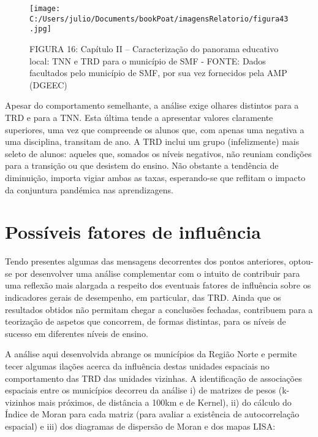 \documentclass[
]{book}
\begin{document}
\begin{figure}
\centering
\texttt{[image: C:/Users/julio/Documents/bookPoat/imagensRelatorio/figura43.jpg]}
\caption{FIGURA 16: Capítulo II -- Caracterização do panorama educativo local: TNN e TRD para o município de SMF - FONTE: Dados facultados pelo município de SMF, por sua vez fornecidos pela AMP (DGEEC)}
\end{figure}

Apesar do comportamento semelhante, a análise exige olhares distintos para a TRD e para a TNN. Esta última tende a apresentar valores claramente superiores, uma vez que compreende os alunos que, com apenas uma negativa a uma disciplina, transitam de ano. A TRD inclui um grupo (infelizmente) mais seleto de alunos: aqueles que, somados os níveis negativos, não reuniam condições para a transição ou que desistem do ensino. Não obstante a tendência de diminuição, importa vigiar ambas as taxas, esperando-se que reflitam o impacto da conjuntura pandémica nas aprendizagens.

\hypertarget{possuxedveis-fatores-de-influuxeancia}{%
\section{\texorpdfstring{\textbf{Possíveis fatores de influência}}{Possíveis fatores de influência}}\label{possuxedveis-fatores-de-influuxeancia}}

Tendo presentes algumas das mensagens decorrentes dos pontos anteriores, optou-se por desenvolver uma análise complementar com o intuito de contribuir para uma reflexão mais alargada a respeito dos eventuais fatores de influência sobre os indicadores gerais de desempenho, em particular, das TRD. Ainda que os resultados obtidos não permitam chegar a conclusões fechadas, contribuem para a teorização de aspetos que concorrem, de formas distintas, para os níveis de sucesso em diferentes níveis de ensino.

A análise aqui desenvolvida abrange os municípios da Região Norte e permite tecer algumas ilações acerca da influência destas unidades espaciais no comportamento das TRD das unidades vizinhas. A identificação de associações espaciais entre os municípios decorreu da análise i) de matrizes de pesos (k-vizinhos mais próximos, de distância a 100km e de Kernel), ii) do cálculo do Índice de Moran para cada matriz (para avaliar a existência de autocorrelação espacial) e iii) dos diagramas de dispersão de Moran e dos mapas LISA:
\end{document}
